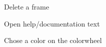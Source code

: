 \documentclass[12pt]{article} %
\begin{document}
\begin{figure}[H]
	\centering
	\caption{Delete a frame}
	\label{fig:UC10}
\end{figure}

\begin{figure}[H]
	\centering
	\caption{Open help/documentation text}
	\label{fig:UC11}
\end{figure}

\begin{figure}[H]
	\centering
	\caption{Chose a color on the colorwheel}
	\label{fig:UC12}
\end{figure}
\end{document}
